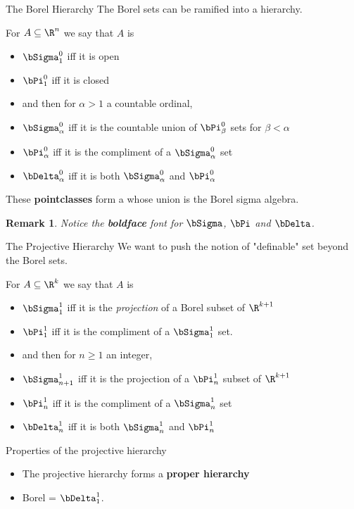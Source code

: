 \documentclass{beamer}
\newtheorem{remark}[theorem]{Remark}
\begin{document}
\begin{frame}{The Borel Hierarchy}
The Borel sets can be ramified into a hierarchy.

\pause

For $A\subseteq \R^{n}$ we say that $A$ is

\begin{itemize}
\item  $\bSigma^0_1$ iff it is open
\item  $\bPi^0_1$ iff it is closed
\item and then for $\alpha > 1$ a countable ordinal,
\item $\bSigma^0_{\alpha}$ iff it is the countable union of
       $\bPi^0_{\beta}$ sets for $\beta < \alpha$
\item $\bPi^0_{\alpha}$ iff it is the compliment of a
      $\bSigma^0_{\alpha}$ set
\item $\bDelta^0_{\alpha}$ iff it is both
      $\bSigma^0_{\alpha}$ and $\bPi^0_{\alpha}$
\end{itemize}

\begin{fact}
These \textbf{pointclasses} form a  whose union
is the Borel sigma algebra.
\end{fact}

\begin{remark}
Notice the \textbf{boldface} font for $\bSigma$, $\bPi$ and $\bDelta$.
\end{remark}

\end{frame}

\begin{frame}{The Projective Hierarchy}
We want to push the notion of "definable" set beyond the Borel sets.

\pause

For $A\subseteq \R^{k}$ we say that $A$ is

\begin{itemize}
\item  $\bSigma^1_1$ iff it is the \emph{projection} of a Borel subset of $\R^{k+1}$
\item  $\bPi^1_1$ iff it is the compliment of a $\bSigma^1_1$ set.
\item and then for $n \geq 1$ an integer,
\item $\bSigma^1_{n+1}$ iff it is the projection of a $\bPi^1_n$ subset of $\R^{k+1}$
\item $\bPi^1_{n}$ iff it is the compliment of a
      $\bSigma^1_{n}$ set
\item $\bDelta^1_{n}$ iff it is both
      $\bSigma^1_{n}$ and $\bPi^1_{n}$
\end{itemize}

\end{frame}

\begin{frame}{Properties of the projective hierarchy}

\begin{fact}
\begin{itemize}
\item  The projective hierarchy forms a \textbf{proper hierarchy}
\item Borel = $\bDelta^1_1$.
\end{itemize}
\end{fact}

\end{frame}
\end{document}
